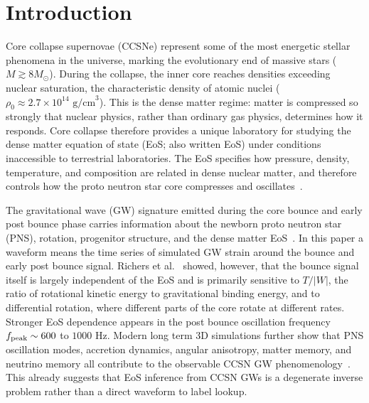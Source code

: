 \documentclass[reprint,aps,prd,floatfix,nofootinbib,superscriptaddress,showpacs]{revtex4-2}
\begin{document}
\maketitle

\section{Introduction}
Core collapse supernovae (CCSNe) represent some of the most energetic stellar phenomena in the universe, marking the evolutionary end of massive stars ($M \gtrsim 8 M_\odot$). During the collapse, the inner core reaches densities exceeding nuclear saturation, the characteristic density of atomic nuclei ($\rho_0 \approx 2.7 \times 10^{14}\text{ g/cm}^3$). This is the dense matter regime: matter is compressed so strongly that nuclear physics, rather than ordinary gas physics, determines how it responds. Core collapse therefore provides a unique laboratory for studying the dense matter equation of state (EoS; also written EoS) under conditions inaccessible to terrestrial laboratories. The EoS specifies how pressure, density, temperature, and composition are related in dense nuclear matter, and therefore controls how the proto neutron star core compresses and oscillates~\cite{oertel2017}.

The gravitational wave (GW) signature emitted during the core bounce and early post bounce phase carries information about the newborn proto neutron star (PNS), rotation, progenitor structure, and the dense matter EoS~\cite{richers2017, abdikamalov2014, oconnor2018,vartanyan2023,choi2024}. In this paper a waveform means the time series of simulated GW strain around the bounce and early post bounce signal. Richers et al.~\cite{richers2017} showed, however, that the bounce signal itself is largely independent of the EoS and is primarily sensitive to $T/|W|$, the ratio of rotational kinetic energy to gravitational binding energy, and to differential rotation, where different parts of the core rotate at different rates. Stronger EoS dependence appears in the post bounce oscillation frequency $f_{\rm peak}\sim 600$ to $1000$ Hz. Modern long term 3D simulations further show that PNS oscillation modes, accretion dynamics, angular anisotropy, matter memory, and neutrino memory all contribute to the observable CCSN GW phenomenology~\cite{vartanyan2023,choi2024,burrows2024}. This already suggests that EoS inference from CCSN GWs is a degenerate inverse problem rather than a direct waveform to label lookup.
\end{document}
